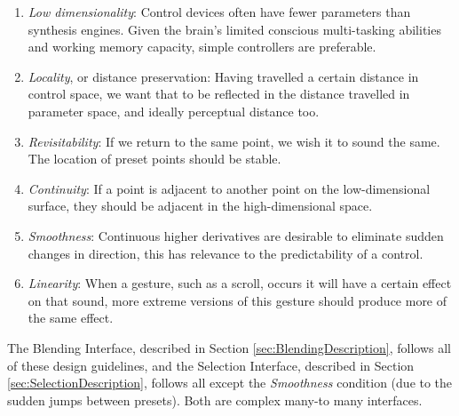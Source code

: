 \documentclass[11pt, oneside]{report}   	%
\begin{document}
\begin{displayquote}
\begin{enumerate}
\setlength\itemsep{-1.2em}
	\item \emph{Low dimensionality}: Control devices often have fewer parameters than synthesis engines. Given the brain’s limited conscious multi-tasking abilities and working memory capacity, simple controllers are preferable.
	\item \emph{Locality}, or distance preservation: Having travelled a certain distance in control space, we want that to be reflected in the distance travelled in parameter space, and ideally perceptual distance too.
	\item \emph{Revisitability}: If we return to the same point, we wish it to sound the same. The location of preset points should be stable.
	\item \emph{Continuity}: If a point is adjacent to another point on the low-dimensional surface, they should be adjacent in the high-dimensional space.
	\item \emph{Smoothness}: Continuous higher derivatives are desirable to eliminate sudden changes in direction, this has relevance to the predictability of a control.
	\item \emph{Linearity}: When a gesture, such as a scroll, occurs it will have a certain effect on that sound, more extreme versions of this gesture should produce more of the same effect. %
\end{enumerate}
\end{displayquote}
The Blending Interface, described in Section \ref{sec:BlendingDescription}, follows all of these design guidelines, and the Selection Interface, described in Section \ref{sec:SelectionDescription}, follows all except the \emph{Smoothness} condition (due to the sudden jumps between presets). Both are complex many-to many interfaces.
\end{document}
